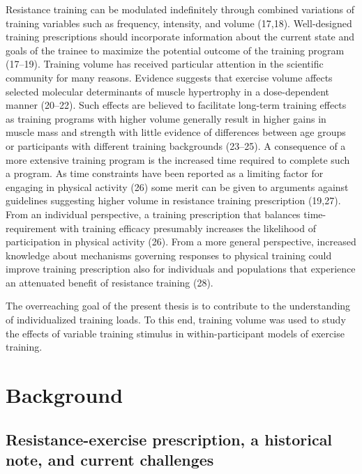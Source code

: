\documentclass[twoside,10pt]{gihclass} %
\begin{document}
Resistance training can be modulated indefinitely through combined variations of training variables such as frequency, intensity, and volume
(17,18).
Well-designed training prescriptions should incorporate information about the current state and goals of the trainee to maximize the potential outcome of the training program
(17--19).
Training volume has received particular attention in the scientific community for many reasons. Evidence suggests that exercise volume affects selected molecular determinants of muscle hypertrophy in a dose-dependent manner
(20--22).
Such effects are believed to facilitate long-term training effects as training programs with higher volume generally result in higher gains in muscle mass and strength with little evidence of differences between age groups or participants with different training backgrounds
(23--25).
A consequence of a more extensive training program is the increased time required to complete such a program. As time constraints have been reported as a limiting factor for engaging in physical activity
(26)
some merit can be given to arguments against guidelines suggesting higher volume in resistance training prescription
(19,27).
From an individual perspective, a training prescription that balances time-requirement with training efficacy presumably increases the likelihood of participation in physical activity
(26).
From a more general perspective, increased knowledge about mechanisms governing responses to physical training could improve training prescription also for individuals and populations that experience an attenuated benefit of resistance training
(28).

The overreaching goal of the present thesis is to contribute to the understanding of individualized training loads. To this end, training volume was used to study the effects of variable training stimulus in within-participant models of exercise training.

\hypertarget{background}{%
\chapter{Background}\label{background}}

\hypertarget{resistance-exercise-prescription-a-historical-note-and-current-challenges}{%
\section{Resistance-exercise prescription, a historical note, and current challenges}\label{resistance-exercise-prescription-a-historical-note-and-current-challenges}}
\end{document}
